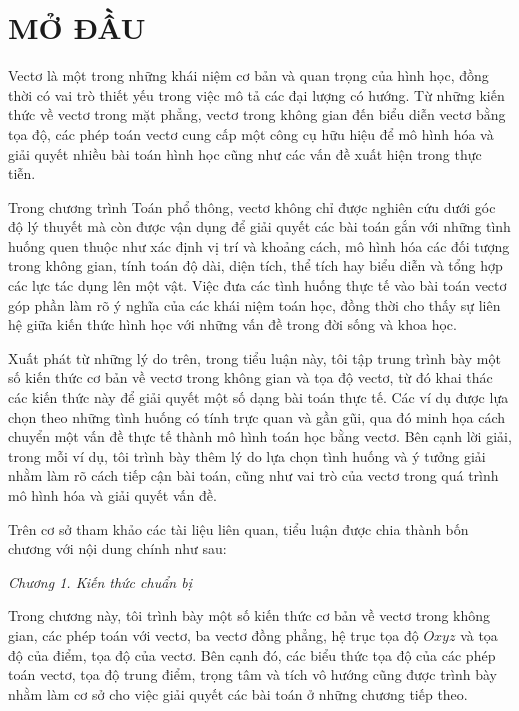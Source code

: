 \documentclass[12pt,a4paper,oneside]{book}
\theoremstyle{theorem}
\theoremstyle{definition}
\begin{document}
	
	\chapter*{MỞ ĐẦU}

        Vectơ là một trong những khái niệm cơ bản và quan trọng của hình học, đồng thời có vai trò thiết yếu trong việc mô tả các đại lượng có hướng. Từ những kiến thức về vectơ trong mặt phẳng, vectơ trong không gian đến biểu diễn vectơ bằng tọa độ, các phép toán vectơ cung cấp một công cụ hữu hiệu để mô hình hóa và giải quyết nhiều bài toán hình học cũng như các vấn đề xuất hiện trong thực tiễn.
        
        Trong chương trình Toán phổ thông, vectơ không chỉ được nghiên cứu dưới góc độ lý thuyết mà còn được vận dụng để giải quyết các bài toán gắn với những tình huống quen thuộc như xác định vị trí và khoảng cách, mô hình hóa các đối tượng trong không gian, tính toán độ dài, diện tích, thể tích hay biểu diễn và tổng hợp các lực tác dụng lên một vật. Việc đưa các tình huống thực tế vào bài toán vectơ góp phần làm rõ ý nghĩa của các khái niệm toán học, đồng thời cho thấy sự liên hệ giữa kiến thức hình học với những vấn đề trong đời sống và khoa học.
        
        Xuất phát từ những lý do trên, trong tiểu luận này, tôi tập trung trình bày một số kiến thức cơ bản về vectơ trong không gian và tọa độ vectơ, từ đó khai thác các kiến thức này để giải quyết một số dạng bài toán thực tế. Các ví dụ được lựa chọn theo những tình huống có tính trực quan và gần gũi, qua đó minh họa cách chuyển một vấn đề thực tế thành mô hình toán học bằng vectơ. Bên cạnh lời giải, trong mỗi ví dụ, tôi trình bày thêm lý do lựa chọn tình huống và ý tưởng giải nhằm làm rõ cách tiếp cận bài toán, cũng như vai trò của vectơ trong quá trình mô hình hóa và giải quyết vấn đề.
        
        Trên cơ sở tham khảo các tài liệu liên quan, tiểu luận được chia thành bốn chương với nội dung chính như sau:

        \textit{Chương 1. Kiến thức chuẩn bị}

        Trong chương này, tôi trình bày một số kiến thức cơ bản về vectơ trong không gian, các phép toán với vectơ, ba vectơ đồng phẳng, hệ trục tọa độ $Oxyz$ và tọa độ của điểm, tọa độ của vectơ. Bên cạnh đó, các biểu thức tọa độ của các phép toán vectơ, tọa độ trung điểm, trọng tâm và tích vô hướng cũng được trình bày nhằm làm cơ sở cho việc giải quyết các bài toán ở những chương tiếp theo.
        
\end{document}
